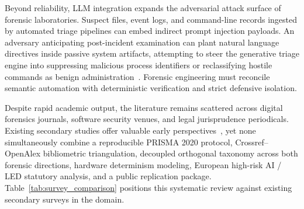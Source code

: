 Beyond reliability, LLM integration expands the adversarial attack surface of forensic laboratories. Suspect files, event logs, and command-line records ingested by automated triage pipelines can embed indirect prompt injection payloads. An adversary anticipating post-incident examination can plant natural language directives inside passive system artifacts, attempting to steer the generative triage engine into suppressing malicious process identifiers or reclassifying hostile commands as benign administration~\cite{chernyshev2026_large, kim2026_evidenceborne}. Forensic engineering must reconcile semantic automation with deterministic verification and strict defensive isolation.

Despite rapid academic output, the literature remains scattered across digital forensics journals, software security venues, and legal jurisprudence periodicals. Existing secondary studies offer valuable early perspectives~\cite{scanlon2023_chatgpt, wickramasekara2025_exploring, chernyshev2026_large, jelodar2026_large, scanlon2026_investigation}, yet none simultaneously combine a reproducible PRISMA 2020 protocol, Crossref--OpenAlex bibliometric triangulation, decoupled orthogonal taxonomy across both forensic directions, hardware determinism modeling, European high-risk AI / LED statutory analysis, and a public replication package. Table~\ref{tab:survey_comparison} positions this systematic review against existing secondary surveys in the domain.

